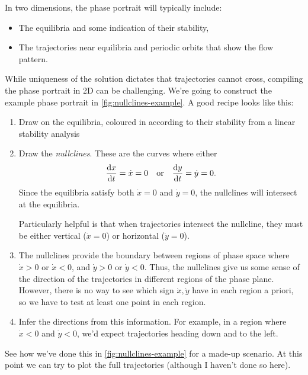 \documentclass[main.tex]{subfiles}
\begin{document}
In two dimensions, the phase portrait will typically include:
\begin{itemize}
	\item The equilibria and some indication of their stability,
	\item The trajectories near equilibria and periodic orbits that show the flow pattern. 
\end{itemize}
While uniqueness of the solution dictates that trajectories cannot cross, compiling the phase portrait in 2D can be challenging. We're going to construct the example phase portrait in \cref{fig:nullclines-example}. A good recipe looks like this:
\begin{enumerate}[label=(\roman*)]
\item Draw on the equilibria, coloured in according to their stability from a linear stability analysis
\item Draw the \emph{nullclines}. These are the curves where either 
\begin{equation}
	\fd{x}{t} = \dot x = 0 \quad\text{or}\quad \fd{y}{t} = \dot y = 0.
\end{equation}
Since the equilibria satisfy both $\dot x=0$ and $\dot y = 0$, the nullclines will intersect at the equilibria. 
	
	Particularly helpful is that when trajectories intersect the nullcline, they must be either vertical ($\dot x = 0$) or horizontal ($\dot y = 0$). 
\item The nullclines provide the boundary between regions of phase space where $\dot x>0$ or $\dot x<0$, and $\dot y>0$ or $\dot y<0$. Thus, the nullclines give us some sense of the direction of the trajectories in different regions of the phase plane. However, there is no way to see which sign $\dot x,\dot y$ have in each region a priori, so we have to test at least one point in each region. 
\item Infer the directions from this information. For example, in a region where $\dot x<0$ and $\dot y<0$, we'd expect trajectories heading down and to the left. 
\end{enumerate}
See how we've done this in \cref{fig:nullclines-example} for a made-up scenario. At this point we can try to plot the full trajectories (although I haven't done so here).

\end{document}
